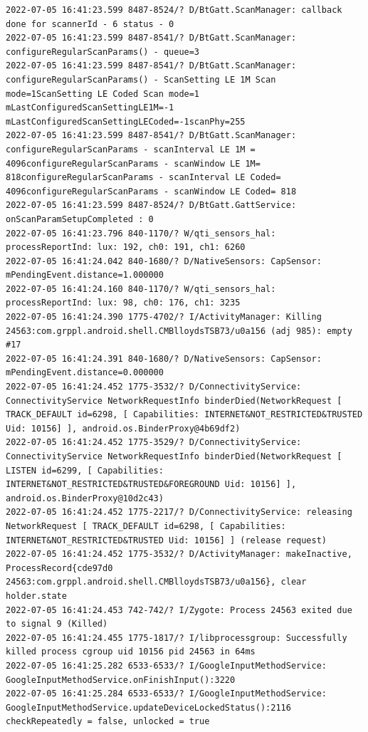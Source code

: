 \documentclass[a4paper,12pt]{book}
\begin{document}
\begin{lstlisting}
2022-07-05 16:41:23.599 8487-8524/? D/BtGatt.ScanManager: callback done for scannerId - 6 status - 0
2022-07-05 16:41:23.599 8487-8541/? D/BtGatt.ScanManager: configureRegularScanParams() - queue=3
2022-07-05 16:41:23.599 8487-8541/? D/BtGatt.ScanManager: configureRegularScanParams() - ScanSetting LE 1M Scan mode=1ScanSetting LE Coded Scan mode=1 mLastConfiguredScanSettingLE1M=-1 mLastConfiguredScanSettingLECoded=-1scanPhy=255
2022-07-05 16:41:23.599 8487-8541/? D/BtGatt.ScanManager: configureRegularScanParams - scanInterval LE 1M = 4096configureRegularScanParams - scanWindow LE 1M= 818configureRegularScanParams - scanInterval LE Coded= 4096configureRegularScanParams - scanWindow LE Coded= 818
2022-07-05 16:41:23.599 8487-8524/? D/BtGatt.GattService: onScanParamSetupCompleted : 0
2022-07-05 16:41:23.796 840-1170/? W/qti_sensors_hal: processReportInd: lux: 192, ch0: 191, ch1: 6260
2022-07-05 16:41:24.042 840-1680/? D/NativeSensors: CapSensor:  mPendingEvent.distance=1.000000
2022-07-05 16:41:24.160 840-1170/? W/qti_sensors_hal: processReportInd: lux: 98, ch0: 176, ch1: 3235
2022-07-05 16:41:24.390 1775-4702/? I/ActivityManager: Killing 24563:com.grppl.android.shell.CMBlloydsTSB73/u0a156 (adj 985): empty #17
2022-07-05 16:41:24.391 840-1680/? D/NativeSensors: CapSensor:  mPendingEvent.distance=0.000000
2022-07-05 16:41:24.452 1775-3532/? D/ConnectivityService: ConnectivityService NetworkRequestInfo binderDied(NetworkRequest [ TRACK_DEFAULT id=6298, [ Capabilities: INTERNET&NOT_RESTRICTED&TRUSTED Uid: 10156] ], android.os.BinderProxy@4b69df2)
2022-07-05 16:41:24.452 1775-3529/? D/ConnectivityService: ConnectivityService NetworkRequestInfo binderDied(NetworkRequest [ LISTEN id=6299, [ Capabilities: INTERNET&NOT_RESTRICTED&TRUSTED&FOREGROUND Uid: 10156] ], android.os.BinderProxy@10d2c43)
2022-07-05 16:41:24.452 1775-2217/? D/ConnectivityService: releasing NetworkRequest [ TRACK_DEFAULT id=6298, [ Capabilities: INTERNET&NOT_RESTRICTED&TRUSTED Uid: 10156] ] (release request)
2022-07-05 16:41:24.452 1775-3532/? D/ActivityManager: makeInactive, ProcessRecord{cde97d0 24563:com.grppl.android.shell.CMBlloydsTSB73/u0a156}, clear holder.state
2022-07-05 16:41:24.453 742-742/? I/Zygote: Process 24563 exited due to signal 9 (Killed)
2022-07-05 16:41:24.455 1775-1817/? I/libprocessgroup: Successfully killed process cgroup uid 10156 pid 24563 in 64ms
2022-07-05 16:41:25.282 6533-6533/? I/GoogleInputMethodService: GoogleInputMethodService.onFinishInput():3220 
2022-07-05 16:41:25.284 6533-6533/? I/GoogleInputMethodService: GoogleInputMethodService.updateDeviceLockedStatus():2116 checkRepeatedly = false, unlocked = true

\end{lstlisting}
\end{document}
